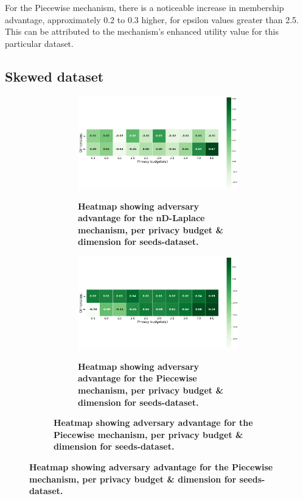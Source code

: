 For the Piecewise mechanism, there is a noticeable increase in membership advantage, approximately 0.2 to 0.3 higher, for epsilon values greater than 2.5. This can be attributed to the mechanism's enhanced utility value for this particular dataset.
\newpage
\subsection{Skewed dataset}
\begin{figure}[H]
  \centering
  \begin{subfigure}[b]{0.85\textwidth}
    \begin{subfigure}[c]{1\textwidth}
      \caption{\textbf{Heatmap showing adversary advantage for the nD-Laplace mechanism, per privacy budget \& dimension for seeds-dataset.}}
      \includegraphics[width=1\textwidth]{Results/nd-laplace/nd-Laplace/skewed-dataset/attack_adv.png}
      \label{fig:privacy_skewed-dataset_adversial_advantage_kd-laplace}
    \end{subfigure}
    \vfill %

    \begin{subfigure}[c]{1\textwidth}
      \caption{\textbf{Heatmap showing adversary advantage for the Piecewise mechanism, per privacy budget \& dimension for seeds-dataset.}}
      \includegraphics[width=1\textwidth]{Results/nd-laplace/piecewise/skewed-dataset/attack_adv.png}
      \label{fig:privacy_skewed-dataset_adversial_advantage_piecewise}
    \end{subfigure}
  \end{subfigure}
\end{figure}

